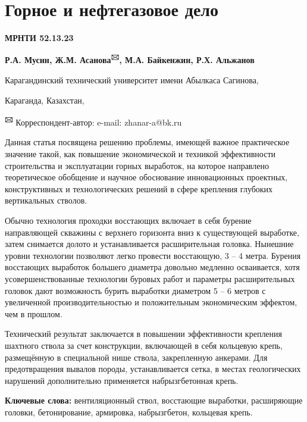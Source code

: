 \let\cleardoublepage\clearpage
\chapter{Горное и нефтегазовое дело}

{\bfseries МРНТИ 52.13.23}


\begin{center}
{\bfseries Р.А. Мусин, Ж.М. Асанова\textsuperscript{🖂}, М.А. Байкенжин, Р.Х. Альжанов}

Карагандинский технический университет имени Абылкаса Сагинова,

Караганда, Казахстан,

{\bfseries \textsuperscript{🖂}} Корреспондент-автор: e-mail: zhanar-a@bk.ru
\end{center}

Данная статья посвящена решению проблемы, имеющей важное практическое
значение такой, как повышение экономической и техникой эффективности
строительства и эксплуатации горных выработок, на которое направлено
теоретическое обобщение и научное обоснование инновационных проектных,
конструктивных и технологических решений в сфере крепления глубоких
вертикальных стволов.

Обычно технология проходки восстающих включает в себя бурение
направляющей скважины с верхнего горизонта вниз к существующей
выработке, затем снимается долото и устанавливается расширительная
головка. Нынешние уровни технологии позволяют легко провести восстающую,
3 -- 4 метра. Бурения восстающих выработок большего диаметра довольно
медленно осваивается, хотя усовершенствованные технологии буровых работ
и параметры расширительных головок дают возможность бурить выработки
диаметром 5 -- 6 метров с увеличенной производительностью и
положительным экономическим эффектом, чем в прошлом.

Технический результат заключается в повышении эффективности крепления
шахтного ствола за счет конструкции, включающей в себя кольцевую крепь,
размещённую в специальной нише ствола, закрепленную анкерами. Для
предотвращения вывалов породы, устанавливается сетка, в местах
геологических нарушений дополнительно применяется набрызгбетонная крепь.

{\bfseries Ключевые слова:} вентиляционный ствол, восстающие выработки,
расширяющие головки, бетонирование, армировка, набрызгбетон, кольцевая
крепь.

